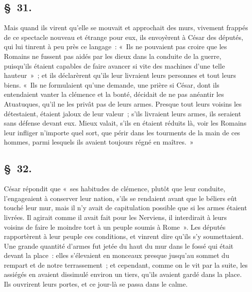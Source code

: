 \documentclass[french,twoside]{book} %
\begin{document}
\subsection[{§ 31.}]{ \textsc{§ 31.} }
\noindent Mais quand ils virent qu’elle se mouvait et approchait des murs, vivement frappés de ce spectacle nouveau et étrange pour eux, ils envoyèrent à César des députés, qui lui tinrent à peu près ce langage : « Ils ne pouvaient pas croire que les Romains ne fussent pas aidés par les dieux dans la conduite de la guerre, puisqu’ils étaient capables de faire avancer si vite des machines d’une telle hauteur » ; et ils déclarèrent qu’ils leur livraient leurs personnes et tout leurs biens. « Ils ne formulaient qu’une demande, une prière si César, dont ils entendaient vanter la clémence et la bonté, décidait de ne pas anéantir les Atuatuques, qu’il ne les privât pas de leurs armes. Presque tout leurs voisins les détestaient, étaient jaloux de leur valeur ; s’ils livraient leurs armes, ils seraient sans défense devant eux. Mieux valait, s’ils en étaient réduits là, voir les Romains leur infliger n’importe quel sort, que périr dans les tourments de la main de ces hommes, parmi lesquels ils avaient toujours régné en maîtres. »
\subsection[{§ 32.}]{ \textsc{§ 32.} }
\noindent César répondit que « ses habitudes de clémence, plutôt que leur conduite, l’engageaient à conserver leur nation, s’ils se rendaient avant que le béliers eût touché leur mur, mais il n’y avait de capitulation possible que si les armes étaient livrées. Il agirait comme il avait fait pour les Nerviens, il interdirait à leurs voisins de faire le moindre tort à un peuple soumis à Rome ». Les députés rapportèrent à leur peuple ces conditions, et vinrent dire qu’ils s’y soumettaient. Une grande quantité d’armes fut jetée du haut du mur dans le fossé qui était devant la place : elles s’élevaient en monceaux presque jusqu’au sommet du rempart et de notre terrassement ; et cependant, comme on le vit par la suite, les assiégés en avaient dissimulé environ un tiers, qu’ils avaient gardé dans la place. Ils ouvrirent leurs portes, et ce jour-là se passa dans le calme.
\end{document}
